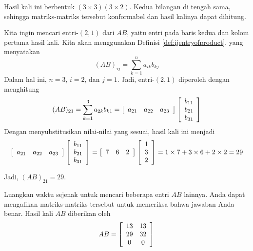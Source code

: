 \begin{solution} Hasil kali ini berbentuk $\left( 3\times
3\right) \left( 3\times 2\right) $. Kedua bilangan di tengah sama, sehingga
matriks-matriks tersebut konformabel dan hasil kalinya dapat dihitung.  

Kita ingin mencari entri-$\left( 2, 1 \right)$ dari $AB$, yaitu entri pada baris kedua dan kolom pertama hasil kali.
Kita akan menggunakan Definisi \ref{def:ijentryofproduct}, yang menyatakan
\begin{equation*}
(AB)_{ij}=\sum_{k=1}^{n}a_{ik}b_{kj}
\end{equation*}
Dalam hal ini, $n=3$, $i=2$, dan $j=1$. Jadi, entri-$\left( 2, 1 \right)$ diperoleh dengan menghitung
\begin{equation*}
 (AB)_{21} = \sum_{k=1}^{3}a_{2k}b_{k1} = 
 \left[
\begin{array}{ccc}
a_{21} & a_{22} & a_{23}
\end{array}
\right] \left[
\begin{array}{c}
b_{11} \\
b_{21} \\
b_{31}
\end{array}
\right]  
\end{equation*}
Dengan menyubstitusikan nilai-nilai yang sesuai, hasil kali ini menjadi
\begin{equation*}
\left[
\begin{array}{ccc}
a_{21} & a_{22} & a_{23}
\end{array}
\right] \left[
\begin{array}{c}
b_{11} \\
b_{21} \\
b_{31}
\end{array}
\right] 
=
\left[
\begin{array}{ccc}
7 & 6 & 2
\end{array}
\right] \left[
\begin{array}{c}
1 \\
3 \\
2
\end{array}
\right]
=
1 \times 7 + 3 \times 6 + 2 \times 2
=
29
\end{equation*}

Jadi, $(AB)_{21} = 29$.

Luangkan waktu sejenak untuk mencari beberapa entri $AB$ lainnya. Anda dapat mengalikan matriks-matriks tersebut untuk memeriksa bahwa jawaban Anda benar.
Hasil kali $AB$ diberikan oleh
\begin{equation*}
AB = \left[
\begin{array}{cc}
13 & 13 \\
29 & 32 \\
0 & 0
\end{array}
\right] 
\end{equation*}
\end{solution}
